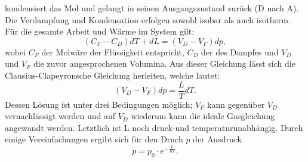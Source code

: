 kondensiert das Mol und gelangt in seinen Ausgangszustand zurück (D nach A).
Die Verdampfung und Kondensation erfolgen sowohl isobar als auch isotherm.
Für die gesamte Arbeit und Wärme im System gilt:
\begin{equation}
    (C_F-C_D)dT + dL = (V_D-V_F)dp,
\end{equation}
wobei $C_F$ der Molwäre der Flüssigkeit entspricht, $C_D$ der des Dampfes und 
$V_D$ und $V_F$ die zuvor angesprochenen Volumina. Aus dieser Gleichung lässt 
sich die Clausius-Clapeyronsche Gleichung herleiten, welche lautet:
\begin{equation}
    \label{eqn:2}
    (V_D-V_F)dp = \frac{L}{T}dT.
\end{equation}
Dessen Lösung ist unter drei Bedingungen möglich; $V_F$ kann gegenüber $V_D$
vernachlässigt werden und auf $V_D$ wiederum kann die ideale Gasgleichung
angewandt werden. Letztlich ist L noch druck-und temperaturunabhängig.
Durch einige Vereinfachungen ergibt sich für den Druch $p$ der Ausdruck
\begin{equation}
    p = p_0 \cdot e^{-\frac{L}{RT}}.
\end{equation}